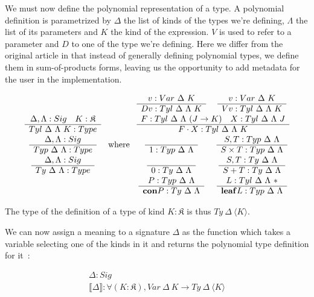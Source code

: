 \documentclass{article}
\newcommand{\lbr}{\llbracket}
\newcommand{\rbr}{\rrbracket}
\newcommand{\sem}[1]{\lbr {#1} \rbr}
\newcommand{\msig}[1]{\langle {#1} \rangle}
\newcommand{\K}{\mathfrak{K}}
\newcommand{\con}{\mathbf{con}}
\newcommand{\lf}{\mathbf{leaf}}
\newcommand{\irule}[2]{\begin{array}{c} {#1} \\\hline {#2}\\ \end{array}}
\begin{document}
We must now define the polynomial representation of a type. A polynomial
definition is parametrized by $\Delta$ the list of kinds of the types we're
defining, $\Lambda$ the list of its parameters and $K$ the kind of the expression.
$V$ is used to refer to a parameter and $D$ to one of the type we're defining.
Here we differ from the original article in that instead of generally defining
polynomial types, we define them in sum-of-products forms, leaving us the
opportunity to add metadata for the user in the implementation.

\[  \begin{array}{c}
        \irule{\Delta, \Lambda : Sig\quad K : \K}{Tyl\ \Delta\ \Lambda\ K : Type} \\
        \irule{\Delta, \Lambda : Sig}{Typ\ \Delta\ \Lambda : Type} \\
        \irule{\Delta, \Lambda : Sig}{Ty\ \Delta\ \Lambda : Type} \\
    \end{array}
    \text{ where }
    \begin{array}{cc}
        \irule{v : Var\ \Delta\ K}{Dv : Tyl\ \Delta\ \Lambda\ K}
            & \irule{v : Var\ \Delta\ K}{Vv : Tyl\ \Delta\ \Lambda\ K} \\
        \multicolumn{2}{c}{\irule{F : Tyl\ \Delta\ \Lambda\ (J\rightarrow K)\quad
                X : Tyl\ \Delta\ \Lambda\ J}
            {F\cdot X : Tyl\ \Delta\ \Lambda\ K}} \\
        \irule{}{1 : Typ\ \Delta\ \Lambda}
            & \irule{S, T : Typ\ \Delta\ \Lambda}{S \times T : Typ\ \Delta\ \Lambda} \\
        \irule{}{0 : Ty\ \Delta\ \Lambda}
            & \irule{S, T : Ty\ \Delta\ \Lambda}{S + T : Ty\ \Delta\ \Lambda} \\
        \irule{P : Typ\ \Delta\ \Lambda}{\con P : Ty\ \Delta\ \Lambda}
            & \irule{L : Tyl\ \Delta\ \Lambda\ *}{\lf L : Typ\ \Delta\ \Lambda} \\
    \end{array}
\]

The type of the definition of a type of kind $K:\K$ is thus $Ty\ \Delta\ \msig{K}$.

We can now assign a meaning to a signature $\Delta$ as the function which takes
a variable selecting one of the kinds in it and returns the polynomial type
definition for it~:

\[\irule{\Delta : Sig}{\sem{\Delta} : \forall (K : \K), Var\ \Delta\ K\rightarrow
Ty\ \Delta\ \msig{K}} \]
\end{document}
